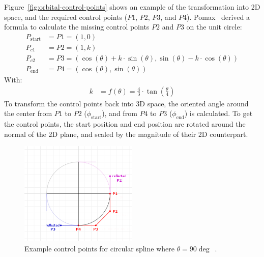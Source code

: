 Figure~\ref{fig:orbital-control-points} shows an example of the transformation into 2D space, and the required
control points ($P1$, $P2$, $P3$, and $P4$).
Pomax~\cite{Pomax2021} derived a formula to calculate the missing control points $P2$ and $P3$ on the unit circle:
\begin{equation}
    \label{eq:control-points}
    \begin{aligned}
        P_{\mathrm{start}} &= P1 = (1, 0) \\
        P_{c1} &= P2 = (1, k) \\
        P_{c2} &= P3 = (\cos(\theta) + k \cdot \sin(\theta), \sin(\theta) - k \cdot \cos(\theta)) \\
        P_{\mathrm{end}} &= P4 = (\cos(\theta), \sin(\theta))
    \end{aligned}
\end{equation}
With:
\begin{equation}
    \label{eq:control-points-factor}
    \begin{aligned}
        k &= f(\theta) = \frac{4}{3} \cdot \tan\left( \frac{\theta}{4} \right)
    \end{aligned}
\end{equation}
To transform the control points back into 3D space, the oriented angle around the center from $P1$ to $P2$
($\phi_{\mathrm{start}}$), and from $P4$ to $P3$ ($\phi_{\mathrm{end}}$) is calculated.
To get the control points, the start position and end position are rotated around the normal of the 2D plane, and
scaled by the magnitude of their 2D counterpart.

\begin{figure}[h]
    \centering
    \includegraphics[width=0.5\textwidth]{content/4_3_autoNavigation/img/ControlPointsReflected}
    \caption{Example control points for circular spline where $\theta = 90\deg$~\cite{Pomax2021}.}
    \label{fig:orbital-reflected-points}
\end{figure}

